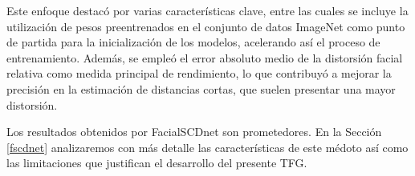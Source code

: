 Este enfoque destacó por varias características clave, entre las cuales se incluye la utilización de pesos preentrenados en el conjunto de datos ImageNet \cite{97} como punto de partida para la inicialización de los modelos, acelerando así el proceso de entrenamiento. Además, se empleó el error absoluto medio de la distorsión facial relativa como medida principal de rendimiento, lo que contribuyó a mejorar la precisión en la estimación de distancias cortas, que suelen presentar una mayor distorsión.

Los resultados obtenidos por FacialSCDnet son prometedores. En la Sección \ref{fscdnet} analizaremos con más detalle las características de este médoto así como las limitaciones que justifican el desarrollo del presente TFG.